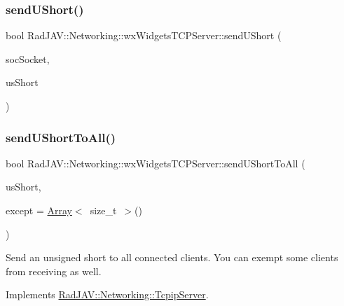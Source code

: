 \subsubsection{\texorpdfstring{send\+U\+Short()}{sendUShort()}}
{\footnotesize\ttfamily bool Rad\+J\+A\+V\+::\+Networking\+::wx\+Widgets\+T\+C\+P\+Server\+::send\+U\+Short (\begin{DoxyParamCaption}\item[{wx\+Socket\+Base $\ast$}]{soc\+Socket,  }\item[{unsigned short}]{us\+Short }\end{DoxyParamCaption})}

\mbox{\label{class_rad_j_a_v_1_1_networking_1_1wx_widgets_t_c_p_server_a8b5f3d3a55504d84a69fa765c11d737f}} 
\subsubsection{\texorpdfstring{send\+U\+Short\+To\+All()}{sendUShortToAll()}}
{\footnotesize\ttfamily bool Rad\+J\+A\+V\+::\+Networking\+::wx\+Widgets\+T\+C\+P\+Server\+::send\+U\+Short\+To\+All (\begin{DoxyParamCaption}\item[{unsigned short}]{us\+Short,  }\item[{\mbox{\hyperlink{class_rad_j_a_v_1_1_array}{Array}}$<$ size\+\_\+t $>$}]{except = {\ttfamily \mbox{\hyperlink{class_rad_j_a_v_1_1_array}{Array}}$<$~size\+\_\+t~$>$()} }\end{DoxyParamCaption})\hspace{0.3cm}{\ttfamily [virtual]}}

Send an unsigned short to all connected clients. You can exempt some clients from receiving as well. 

Implements \mbox{\hyperlink{class_rad_j_a_v_1_1_networking_1_1_tcpip_server_afa2c3dc49d91e9205d6b814266fa8d0e}{Rad\+J\+A\+V\+::\+Networking\+::\+Tcpip\+Server}}.

\mbox{\label{class_rad_j_a_v_1_1_networking_1_1wx_widgets_t_c_p_server_a226d05d1fee31099bb2f9b0581b2f04c}} 
